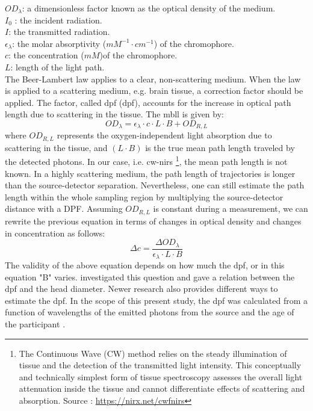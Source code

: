 \noindent 
$OD_{\lambda} $: a dimensionless factor known as the optical density of the medium.  \\
$I_0$ : the incident radiation. \\
$I$: the transmitted radiation. \\
$\epsilon _{\lambda}$: the molar absorptivity ($mM^{-1} \cdot cm^{-1}$) of the chromophore. \\
$c$: the concentration ($mM$)of the chromophore. \\
$L$: length of the light path. \\

The Beer-Lambert law applies to a clear, non-scattering medium. When the law is applied to a scattering medium, e.g. brain tissue, a correction factor should be applied. The factor, called \acrlong{dpf} (\acrshort{dpf}), accounts for the increase in optical path length due to scattering in the tissue. The \acrlong{mbll} \citep {Delpy_1988} is given by:
\begin{equation} 
OD_{\lambda} = \epsilon _{\lambda} \cdot c \cdot L \cdot B + OD_{R,L}
\end{equation} 
where $OD_{R,L}$ represents the oxygen-independent light absorption due to scattering in the tissue, and $(L \cdot B)$ is the true mean path length traveled by the detected photons. In our case, i.e. \acrshort{cw-nirs} \footnote {The Continuous Wave (CW) method relies on the steady illumination of tissue and the detection of the transmitted light intensity.  This conceptually and technically simplest form of tissue spectroscopy assesses the overall  light attenuation inside the tissue and cannot differentiate effects of scattering and absorption. Source : \url{https://nirx.net/cwfnirs}}, the mean path length is not known. In a highly scattering medium, the path length of trajectories is longer than the source-detector separation. Nevertheless, one can still estimate the path length within the whole sampling region by multiplying the source-detector distance with a DPF. Assuming $OD_{R,L}$ is constant during a measurement, we can rewrite the previous equation in terms of changes in optical density and changes in concentration as follows:
\begin{equation} 
\Delta c =\frac { \Delta OD_{\lambda}} {\epsilon _{\lambda} \cdot L \cdot B}
\end{equation} 
The validity of the above equation depends on how much the \acrshort{dpf}, or in this equation "B" varies. \citep {Delpy_1988} investigated this question and gave a relation between the \acrshort{dpf} and the head diameter. Newer research also provides different ways to estimate the \acrshort{dpf}. In the scope of this present study, the \acrshort{dpf} was calculated from a function of wavelengths of the emitted photons from the source and the age of the participant \citep {Duncan1996MeasurementOC}.



